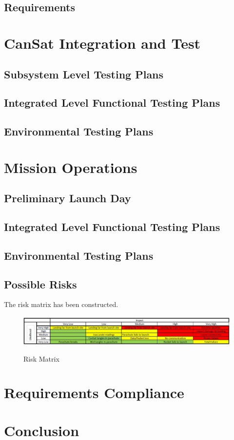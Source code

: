 \documentclass[10pt]{article}
\begin{document}
\subsection{Requirements}

\newpage

\section{CanSat Integration and Test}
\subsection{Subsystem Level Testing Plans}
\subsection{Integrated Level Functional Testing Plans}
\subsection{Environmental Testing Plans}

\newpage

\section{Mission Operations}
\subsection{Preliminary Launch Day}
\subsection{Integrated Level Functional Testing Plans}
\subsection{Environmental Testing Plans}
\subsection{Possible Risks}
The risk matrix has been constructed.
\begin{figure}[H]
\centering
\includegraphics[scale =0.4]{risk.JPG}
\label{fig:risk}
\caption{Risk Matrix}
\end{figure}

\newpage

\section{Requirements Compliance}

\section{Conclusion}

\newpage


\end{document}
